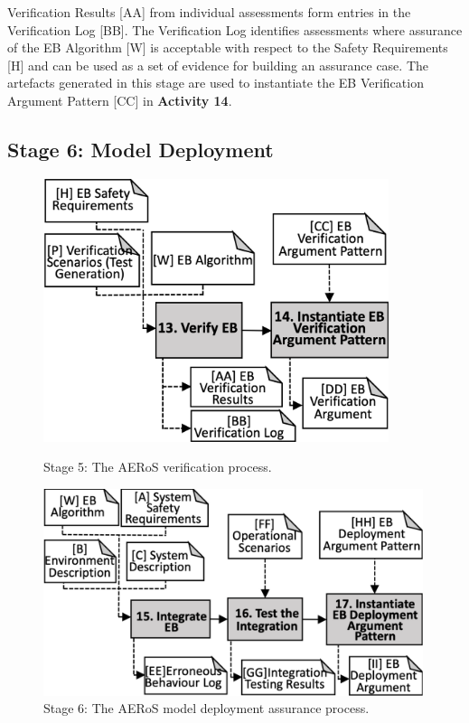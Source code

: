 \documentclass[runningheads]{llncs}
\begin{document}
Verification Results [AA] from individual assessments form entries in the Verification Log [BB]. The Verification Log identifies assessments where assurance of the EB Algorithm [W] is acceptable with respect to the Safety Requirements [H] and can be used as a set of evidence for building an assurance case. %
The artefacts generated in this stage are used to instantiate the EB Verification Argument Pattern [CC] in \textbf{Activity 14}.

\subsection{Stage 6: Model Deployment} \label{framework-stage6}
\begin{figure}[!t]
	\centering
	\begin{minipage}[b]{.47\textwidth}
			\centering
			\includegraphics[width=0.9\textwidth]{figures/AERoS-Stage5.pdf}%
			\vspace{-2ex}
			\caption{Stage 5: The AERoS verification process.}
			\label{amlas-a-stage5}
	      \end{minipage}%
      \hspace*{0.01\textwidth}
	\begin{minipage}[b]{.5\textwidth}
			\centering
			\includegraphics[width=0.99\textwidth]{figures/AERoS-Stage6.pdf}%
			\vspace{-2ex}
			\caption{Stage 6: The AERoS model deployment assurance process.}
			\label{amlas-a-stage6}
		\end{minipage}
	\vspace{-4ex}
\end{figure}
\end{document}
